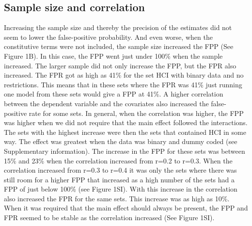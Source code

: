 \subsection{Sample size and correlation}
Increasing the sample size and thereby the precision of the estimates did not seem to lower the false-positive probability. And even worse, when the constitutive terms were not included, the sample size increased the FPP (See Figure 1B). In this case, the FPP went just under 100\% when the sample increased. The larger sample did not only increase the FPP, but the FPR also increased. The FPR got as high as 41\% for the set HCI with binary data and no restrictions. This means that in these sets where the FPR was 41\% just running one model from these sets would give a FPP at 41\%. 
A higher correlation between the dependent variable and the covariates also increased the false-positive rate for some sets. In general, when the correlation was higher, the FPP was higher when we did not require that the main effect followed the interactions. The sets with the highest increase were then the sets that contained HCI in some way. The effect was greatest when the data was binary and dummy coded (see Supplementary information). The increase in the FPP for these sets was between 15\% and 23\% when the correlation increased from r=0.2 to r=0.3. When the correlation increased from r=0.3 to r=0.4 it was only the sets where there was still room for a higher FPP that increased as a high number of the sets had a FPP of just below 100\% (see Figure 1SI). With this increase in the correlation also increased the FPR for the same sets. This increase was as high as 10\%. When it was required that the main effect should always be present, the FPP and FPR seemed to be stable as the correlation increased (See Figure 1SI).

